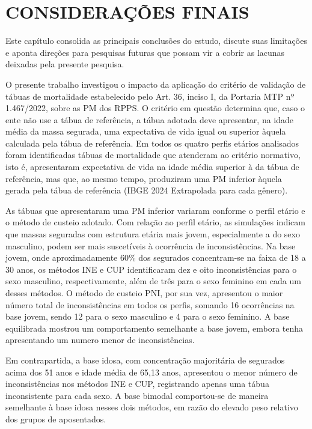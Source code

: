 \chapter{\textbf{CONSIDERAÇÕES FINAIS}}

Este capítulo consolida as principais conclusões do estudo, discute suas limitações e aponta direções para pesquisas futuras que possam vir a cobrir as lacunas deixadas pela presente pesquisa.

O presente trabalho investigou o impacto da aplicação do critério de validação de tábuas de mortalidade estabelecido pelo Art. 36, inciso I, da Portaria MTP nº 1.467/2022, sobre as PM dos RPPS. O critério em questão determina que, caso o ente não use a tábua de referência, a tábua adotada deve apresentar, na idade média da massa segurada, uma expectativa de vida igual ou superior àquela calculada pela tábua de referência. Em todos os quatro perfis etários analisados foram identificadas tábuas de mortalidade que atenderam ao critério normativo, isto é, apresentaram expectativa de vida na idade média superior à da tábua de referência, mas que, ao mesmo tempo, produziram uma PM inferior àquela gerada pela tábua de referência (IBGE 2024 Extrapolada para cada gênero).

As tábuas que apresentaram uma PM inferior variaram conforme o perfil etário e o método de custeio adotado. Com relação ao perfil etário, as simulações indicam que massas seguradas com estrutura etária mais jovem, especialmente a do sexo masculino, podem ser mais suscetíveis à ocorrência de inconsistências. Na base jovem, onde aproximadamente 60\% dos segurados concentram-se na faixa de 18 a 30 anos, os métodos INE e CUP identificaram dez e oito inconsistências para o sexo masculino, respectivamente, além de três para o sexo feminino em cada um desses métodos. O método de custeio PNI, por sua vez, apresentou o maior número total de inconsistências em todos os perfis, somando 16 ocorrências na base jovem, sendo 12 para o sexo masculino e 4 para o sexo feminino. A base equilibrada mostrou um comportamento semelhante a base jovem, embora tenha apresentando um numero menor de inconsistências.

Em contrapartida, a base idosa, com concentração majoritária de segurados acima dos 51 anos e idade média de 65,13 anos, apresentou o menor número de inconsistências nos métodos INE e CUP, registrando apenas uma tábua inconsistente para cada sexo. A base bimodal comportou-se de maneira semelhante à base idosa nesses dois métodos, em razão do elevado peso relativo dos grupos de aposentados.

